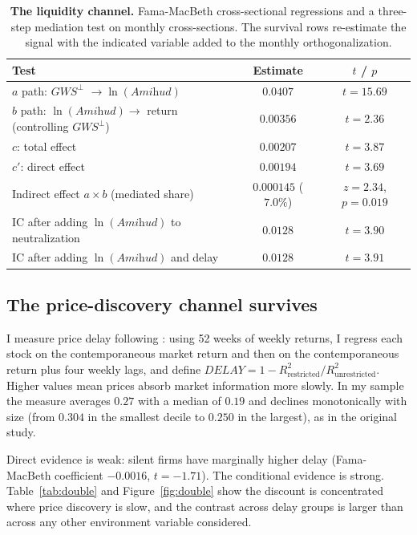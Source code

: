 \documentclass[12pt]{article}
\newcommand{\gwsp}{\ensuremath{\textit{GWS}^{\perp}}}
\begin{document}
\begin{table}[t]
\centering\small
\caption{\textbf{The liquidity channel.} Fama-MacBeth cross-sectional
regressions and a three-step mediation test on monthly cross-sections. The
survival rows re-estimate the signal with the indicated variable added to the
monthly orthogonalization.}
\label{tab:liq}
\vspace{6pt}
\begin{tabular}{lcc}
\toprule
Test & Estimate & $t$ / $p$ \\
\midrule
$a$ path: \gwsp{} $\to \ln(\textit{Amihud})$ & $0.0407$ & $t=15.69$ \\
$b$ path: $\ln(\textit{Amihud}) \to$ return (controlling \gwsp{}) & $0.00356$ & $t=2.36$ \\
$c$: total effect & $0.00207$ & $t=3.87$ \\
$c'$: direct effect & $0.00194$ & $t=3.69$ \\
Indirect effect $a\times b$ (mediated share) & $0.000145$ ($\mathbf{7.0\%}$) & $z=2.34$, $p=0.019$ \\
\midrule
IC after adding $\ln(\textit{Amihud})$ to neutralization & $0.0128$ & $t=3.90$ \\
IC after adding $\ln(\textit{Amihud})$ and delay & $0.0128$ & $t=3.91$ \\
\bottomrule
\end{tabular}
\end{table}

\subsection{The price-discovery channel survives}
I measure price delay following \citet{hou2005}: using 52 weeks of weekly
returns, I regress each stock on the contemporaneous market return and then on
the contemporaneous return plus four weekly lags, and define
$\textit{DELAY} = 1 - R^2_{\text{restricted}}/R^2_{\text{unrestricted}}$.
Higher values mean prices absorb market information more slowly. In my sample
the measure averages $0.27$ with a median of $0.19$ and declines monotonically
with size (from $0.304$ in the smallest decile to $0.250$ in the largest), as
in the original study.

Direct evidence is weak: silent firms have marginally higher delay
(Fama-MacBeth coefficient $-0.0016$, $t=-1.71$). The conditional evidence is
strong. Table~\ref{tab:double} and Figure~\ref{fig:double} show the discount is
concentrated where price discovery is slow, and the contrast across delay
groups is larger than across any other environment variable considered.
\end{document}
